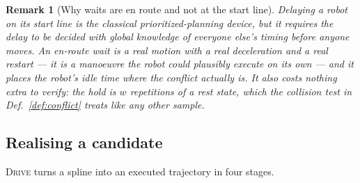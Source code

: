 \documentclass[conference]{IEEEtran}
\newtheorem{remark}{Remark}
\begin{document}
\begin{remark}[Why waits are en route and not at the start line]
\label{rem:enroute}
Delaying a robot on its start line is the classical prioritized-planning device, but it
requires the delay to be decided with global knowledge of everyone else's timing before
anyone moves. An en-route wait is a real motion with a real deceleration and a real restart
--- it is a manoeuvre the robot could plausibly execute on its own --- and it places the
robot's idle time where the conflict actually is. It also costs nothing extra to verify:
the hold is $w$ repetitions of a rest state, which the collision test in
Def.~\ref{def:conflict} treats like any other sample.
\end{remark}

\subsection{Realising a candidate}
\label{sec:realise}

\textsc{Drive} turns a spline into an executed trajectory in four stages.
\end{document}
